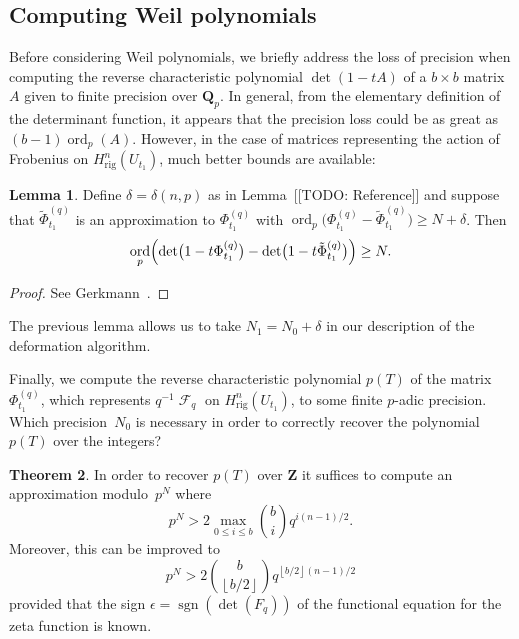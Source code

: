 \documentclass[a4paper,11pt]{article}
\numberwithin{equation}{section}
\providecommand{\floor}[1]{\left\lfloor#1\right\rfloor}   %
\DeclareMathOperator{\ord}{ord}          %
\DeclareMathOperator{\sgn}{sgn}          %
\DeclareMathOperator{\Frob}{\mathcal{F}} %
\providecommand{\Hrig}{H_{\text{rig}}}  %
\theoremstyle{definition}
\newtheorem{thm}{Theorem}[section]
\newtheorem{lem}[thm]{Lemma}
\begin{document}
\subsection{Computing Weil polynomials}

Before considering Weil polynomials, we briefly address the loss 
of precision when computing the reverse characteristic polynomial 
$\det(1 - t A)$ of a $b \times b$ matrix~$A$ given to finite precision 
over $\mathbf{Q}_p$.  In general, from the elementary definition of the 
determinant function, it appears that the precision loss could be as 
great as $(b-1) \ord_p(A)$.  However, in the case of matrices representing 
the action of Frobenius on $\Hrig^n(U_{t_1})$, much better bounds are 
available:

\begin{lem}
Define $\delta = \delta(n,p)$ as in Lemma~[[TODO: Reference]] and 
suppose that $\tilde{\Phi}_{t_1}^{(q)}$ is an approximation to 
$\Phi_{t_1}^{(q)}$ with 
$\ord_p\bigl(\Phi_{t_1}^{(q)}-\tilde{\Phi}_{t_1}^{(q)}\bigr) \geq N + \delta$.
Then 
\begin{equation}
\ord_p \Bigl( \det\bigl(1 - t \Phi_{t_1}^{(q)}\bigr) 
            - \det\bigl(1 - t \tilde{\Phi}_{t_1}^{(q)}\bigr) \Bigr) \geq N.
\end{equation}
\end{lem}

\begin{proof} 
See Gerkmann~\citep[Lemma~3.3, Lemma~3.4]{Gerkmann2007}.
\end{proof}

The previous lemma allows us to take $N_1 = N_0 + \delta$ in our 
description of the deformation algorithm.

Finally, we compute the 
reverse characteristic polynomial $p(T)$ of the matrix $\Phi_{t_1}^{(q)}$, 
which represents $q^{-1} \Frob_q$ on $\Hrig^n(U_{t_1})$, to some finite 
$p$-adic precision.  Which precision~$N_0$ is necessary in order to 
correctly recover the polynomial~$p(T)$ over the integers?

\begin{thm} \label{thm:N0}
In order to recover $p(T)$ over $\mathbf{Z}$ it suffices to compute 
an approximation modulo~$p^N$ where 
\begin{equation}
p^N > 2 \max_{0 \leq i \leq b} \binom{b}{i} q^{i (n-1) / 2}.
\end{equation}
Moreover, this can be improved to 
\begin{equation}
p^N > 2 \binom{b}{\floor{b/2}} q^{\floor{b/2} (n-1) / 2}
\end{equation}
provided that the sign $\epsilon = \sgn(\det(F_q))$ of the 
functional equation for the zeta function is known.
\end{thm}
\end{document}
